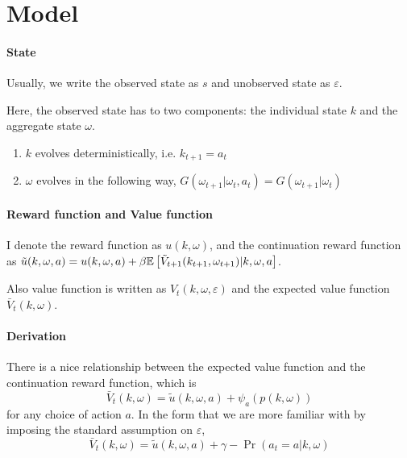\documentclass[12pt]{article}[margin=1in]
\begin{document}
\section{Model}
\paragraph{State} Usually, we write the observed state as $s$ and unobserved state as $\varepsilon$.

Here, the observed state has to two components: the individual state $k$ and the aggregate state $\omega$. 
\begin{enumerate}
    \item $k$ evolves deterministically, i.e. $k_{t+1} = a_t$
    \item $\omega$ evolves in the following way, $G(\omega_{t+1} | \omega_t, a_t) = G(\omega_{t+1} | \omega_t)$
\end{enumerate}

\paragraph{Reward function and Value function}

I denote the reward function as $u(k, \omega)$, and the continuation reward function as $\tilde{u}(k, \omega,a) = u(k, \omega, a) + \beta \mathbb{E}\left[\tilde{V}_{t+1}(k_{t+1}, \omega_{t+1}) | k, \omega, a\right]$.

Also  value function is written as $V_t(k,\omega, \varepsilon)$ and the expected value function $\bar{V}_t(k,\omega)$. 

\paragraph{Derivation} There is a nice relationship between the expected value function and the continuation reward function, which is
$$ \bar{V}_t(k, \omega) = \tilde{u}(k, \omega, a) + \psi_a(p(k,\omega))$$  for any choice of action $a$.
In the form that we are more familiar with by imposing the standard assumption on $\varepsilon$,
$$ \bar{V}_t(k, \omega) = \tilde{u}(k, \omega, a) + \gamma -\Pr(a_t = a | k, \omega) $$
\end{document}
